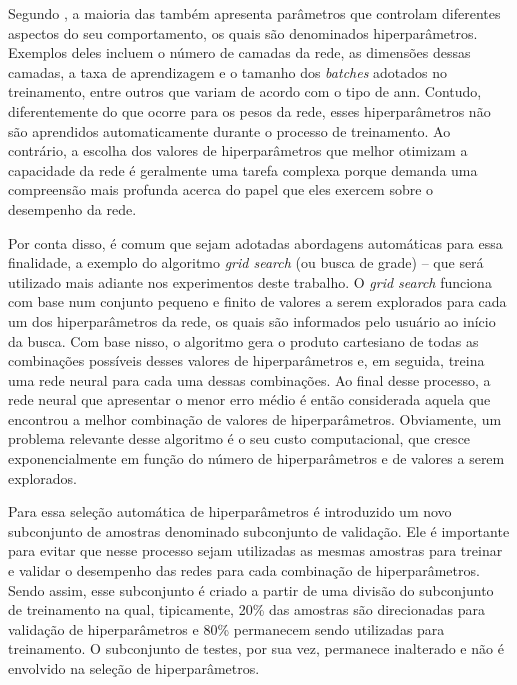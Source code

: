 
Segundo , a maioria das  também apresenta parâmetros que controlam diferentes aspectos do seu comportamento, os quais são denominados hiperparâmetros.
Exemplos deles incluem o número de camadas da rede, as dimensões dessas camadas, a taxa de aprendizagem e o tamanho dos \textit{batches} adotados no treinamento, entre outros que variam de acordo com o tipo de \acrshort{ann}.
Contudo, diferentemente do que ocorre para os pesos da rede, esses hiperparâmetros não são aprendidos automaticamente durante o processo de treinamento. 
Ao contrário, a escolha dos valores de hiperparâmetros que melhor otimizam a capacidade da rede é geralmente uma tarefa complexa porque demanda uma compreensão mais profunda acerca do papel que eles exercem sobre o desempenho da rede.


Por conta disso, é comum que sejam adotadas abordagens automáticas para essa finalidade, a exemplo do algoritmo \textit{grid search} (ou busca de grade) -- que será utilizado mais adiante nos experimentos deste trabalho.
O \textit{grid search} funciona com base num conjunto pequeno e finito de valores a serem explorados para cada um dos hiperparâmetros da rede, os quais são informados pelo usuário ao início da busca.
Com base nisso, o algoritmo gera o produto cartesiano de todas as combinações possíveis desses valores de hiperparâmetros e, em seguida, treina uma rede neural para cada uma dessas combinações.
Ao final desse processo, a rede neural que apresentar o menor erro médio é então considerada aquela que encontrou a melhor combinação de valores de hiperparâmetros.
Obviamente, um problema relevante desse algoritmo é o seu custo computacional, que cresce exponencialmente em função do número de hiperparâmetros e de valores a serem explorados.

Para essa seleção automática de hiperparâmetros é introduzido um novo subconjunto de amostras denominado subconjunto de validação.
Ele é importante para evitar que nesse processo sejam utilizadas as mesmas amostras para treinar e validar o desempenho das redes para cada combinação de hiperparâmetros.
Sendo assim, esse subconjunto é criado a partir de uma divisão do subconjunto de treinamento na qual, tipicamente, 20\% das amostras são direcionadas para validação de hiperparâmetros e 80\% permanecem sendo utilizadas para treinamento.
O subconjunto de testes, por sua vez, permanece inalterado e não é envolvido na seleção de hiperparâmetros.
